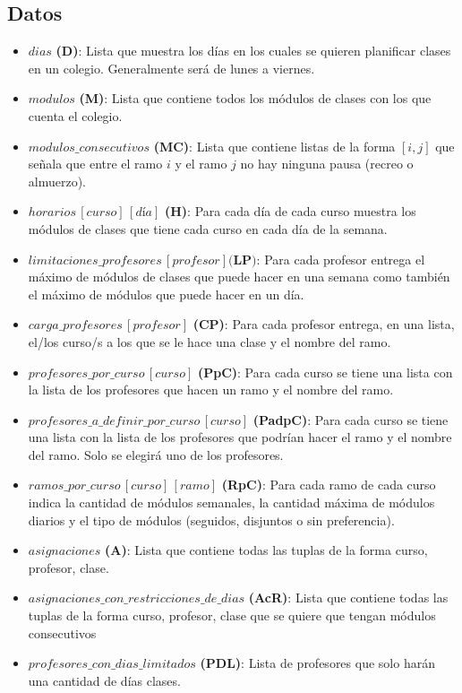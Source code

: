 \documentclass[letterpaper]{article}
\begin{document}
\subsection{Datos}
\begin{itemize}
    \item $dias$ \textbf{(D)}: Lista que muestra los días en los cuales se quieren planificar clases en un colegio. Generalmente será de lunes a viernes.
    \item $modulos$ \textbf{(M)}: Lista que contiene todos los módulos de clases con los que cuenta el colegio.
    \item $modulos\_consecutivos$ \textbf{(MC)}: Lista que contiene listas de la forma $[i,j]$ que señala que entre el ramo $i$ y el ramo $j$ no hay ninguna pausa (recreo o almuerzo).
    \item $horarios\,[curso]\,[día]$ \textbf{(H)}: Para cada día de cada curso muestra los módulos de clases que tiene cada curso en cada día de la semana.
    \item $limitaciones\_profesores\,[profesor] \textbf{(LP)}$: Para cada profesor entrega el máximo de módulos de clases que puede hacer en una semana como también el máximo de módulos que puede hacer en un día.
    \item $carga\_profesores\,[profesor]$ \textbf{(CP)}: Para cada profesor entrega, en una lista, el/los curso/s a los que se le hace una clase y el nombre del ramo.
    \item $profesores\_por\_curso\,[curso]$ \textbf{(PpC)}: Para cada curso se tiene una lista con la lista de los profesores que hacen un ramo y el nombre del ramo.
    \item $profesores\_a\_definir\_por\_curso\,[curso]$ \textbf{(PadpC)}: Para cada curso se tiene una lista con la lista de los profesores que podrían hacer el ramo y el nombre del ramo. Solo se elegirá uno de los profesores.
    \item $ramos\_por\_curso \, [curso] \, [ramo]$ \textbf{(RpC)}: Para cada ramo de cada curso indica la cantidad de módulos semanales, la cantidad máxima de módulos diarios y el tipo de módulos (seguidos, disjuntos o sin preferencia).
    \item $asignaciones$ \textbf{(A)}: Lista que contiene todas las tuplas de la forma curso, profesor, clase.
    \item $asignaciones\_con\_restricciones\_de\_dias$ \textbf{(AcR)}: Lista que contiene todas las tuplas de la forma curso, profesor, clase que se quiere que tengan módulos consecutivos
    \item $profesores\_con\_dias\_limitados$ \textbf{(PDL)}: Lista de profesores que solo harán una cantidad de días clases.

\end{itemize}
\end{document}
